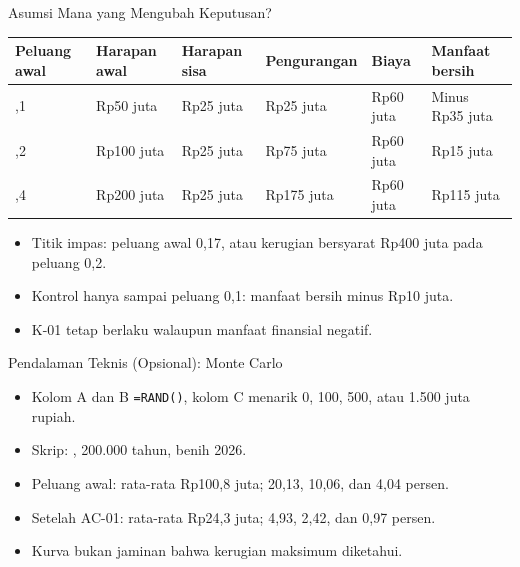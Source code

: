 \documentclass[aspectratio=169, table, 12pt]{beamer}
\begin{document}
\begin{frame}{{\Large Asumsi Mana yang Mengubah Keputusan?}}
  \vspace{2pt}
  \scriptsize
  \begin{tabularx}{\textwidth}{|>{\raggedright\arraybackslash}p{}|>{\raggedright\arraybackslash}X|>{\raggedright\arraybackslash}X|>{\raggedright\arraybackslash}X|>{\raggedright\arraybackslash}X|>{\raggedright\arraybackslash}X|}
    \hline
    \textbf{Peluang awal} & \textbf{Harapan awal} & \textbf{Harapan sisa} & \textbf{Pengurangan} &
    \textbf{Biaya} & \textbf{Manfaat bersih} \\ \hline
    0,1 & Rp50 juta & Rp25 juta & Rp25 juta & Rp60 juta & Minus Rp35 juta \\ \hline
    0,2 & Rp100 juta & Rp25 juta & Rp75 juta & Rp60 juta & Rp15 juta \\ \hline
    0,4 & Rp200 juta & Rp25 juta & Rp175 juta & Rp60 juta & Rp115 juta \\ \hline
  \end{tabularx}

  \vspace{5pt}
  \small
  \begin{itemize}
    \item Titik impas: peluang awal 0,17, atau kerugian bersyarat Rp400 juta pada peluang 0,2.
    \item Kontrol hanya sampai peluang 0,1: manfaat bersih minus Rp10 juta.
    \item K-01 tetap berlaku walaupun manfaat finansial negatif.
  \end{itemize}
\end{frame}

\begin{frame}{{\Large Pendalaman Teknis (Opsional): Monte Carlo}}
  \vspace{6pt}
  \small
  \begin{itemize}
    \item Kolom A dan B \texttt{=RAND()}, kolom C menarik 0, 100, 500, atau 1.500 juta rupiah.
    \item Skrip: , 200.000 tahun, benih 2026.
    \item Peluang awal: rata-rata Rp100,8 juta; 20,13, 10,06, dan 4,04 persen.
    \item Setelah AC-01: rata-rata Rp24,3 juta; 4,93, 2,42, dan 0,97 persen.
    \item Kurva bukan jaminan bahwa kerugian maksimum diketahui.
  \end{itemize}
\end{frame}
\end{document}
